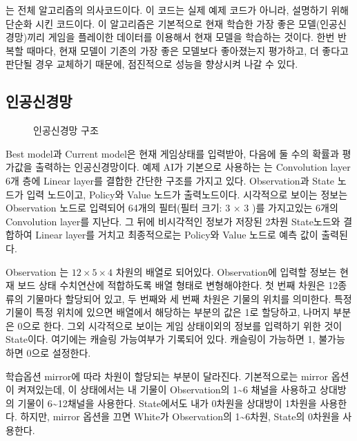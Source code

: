 \documentclass[letterpaper,10pt,english]{sphinxmanual}
\begin{document}
{\hyperref[\detokenize{05-self_learning:self-learning-code}]{}} 는 전체 알고리즘의 의사코드이다. 이 코드는 실제 예제 코드가 아니라, 설명하기 위해 단순화 시킨 코드이다.
이 알고리즘은 기본적으로 현재 학습한 가장 좋은 모델(인공신경망)끼리 게임을 플레이한 데이터를 이용해서 현재 모델을 학습하는 것이다.
한번 반복할 때마다, 현재 모델이 기존의 가장 좋은 모델보다 좋아졌는지 평가하고, 더 좋다고 판단될 경우 교체하기 때문에,
점진적으로 성능을 향상시켜 나갈 수 있다.


\subsection{인공신경망}
\label{\detokenize{05-self_learning:id4}}
\begin{figure}[htbp]
\centering
\capstart

\noindent{}
\caption{인공신경망 구조}\label{\detokenize{05-self_learning:neural-network-architecture}}\label{\detokenize{05-self_learning:id10}}\end{figure}

Best model과 Current model은 현재 게임상태를 입력받아, 다음에 둘 수의 확률과 평가값을 출력하는 인공신경망이다.
예제 AI가 기본으로 사용하는 {\hyperref[\detokenize{05-self_learning:neural-network-architecture}]{}} 는 Convolution layer 6개 층에 Linear layer를 결합한
간단한 구조를 가지고 있다. Observation과 State 노드가 입력 노드이고, Policy와 Value 노드가 출력노드이다.
시각적으로 보이는 정보는 Observation 노드로 입력되어 64개의 필터(필터 크기: 3 \(\times\) 3 )를 가지고있는 6개의 Convolution layer를 지난다.
그 뒤에 비시각적인 정보가 저장된 2차원 State노드와 결합하여 Linear layer를 거치고 최종적으로는 Policy와 Value 노드로 예측 값이 출력된다.

Observation 는 \(12 \times 5 \times 4\) 차원의 배열로 되어있다.
Observation에 입력할 정보는 현재 보드 상태 수치연산에 적합하도록 배열 형태로 변형해야한다.
첫 번째 차원은 12종류의 기물마다 할당되어 있고, 두 번째와 세 번째 차원은 기물의 위치를 의미한다. 특정 기물이 특정 위치에 있으면
배열에서 해당하는 부분의 값은 1로 할당하고, 나머지 부분은 0으로 한다.
그외 시각적으로 보이는 게임 상태이외의 정보를 입력하기 위한 것이 State이다. 여기에는 캐슬링 가능여부가 기록되어 있다.
캐슬링이 가능하면 1, 불가능하면 0으로 설정한다.

학습옵션 mirror에 따라 차원이 할당되는 부분이 달라진다. 기본적으로는 mirror 옵션이 켜져있는데, 이 상태에서는
내 기물이 Observation의 1\textasciitilde{}6 채널을 사용하고 상대방의 기물이 6\textasciitilde{}12채널을 사용한다. State에서도 내가 0차원을 상대방이 1차원을 사용한다.
하지만, mirror 옵션을 끄면 White가 Observation의 1\textasciitilde{}6차원, State의 0차원을 사용한다.
\end{document}
